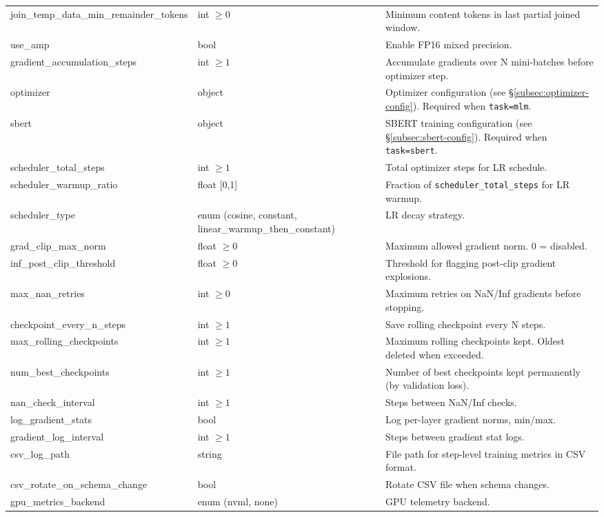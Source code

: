 \begin{longtable}{>{\ttfamily}l>{\raggedright\arraybackslash}p{3.5cm}>{\raggedright\arraybackslash}p{8.5cm}}
join\_temp\_data\_min\_remainder\_tokens & int $\ge 0$ & Minimum content tokens in last partial joined window. \\
use\_amp & bool & Enable FP16 mixed precision. \\
gradient\_accumulation\_steps & int $\ge 1$ & Accumulate gradients over N mini-batches before optimizer step. \\
optimizer & object & Optimizer configuration (see \S\ref{subsec:optimizer-config}). Required when \texttt{task=mlm}. \\
sbert & object & SBERT training configuration (see \S\ref{subsec:sbert-config}). Required when \texttt{task=sbert}. \\
scheduler\_total\_steps & int $\ge 1$ & Total optimizer steps for LR schedule. \\
scheduler\_warmup\_ratio & float [0,1] & Fraction of \texttt{scheduler\_total\_steps} for LR warmup. \\
scheduler\_type & enum (cosine, constant, linear\_warmup\_then\_constant) & LR decay strategy. \\
grad\_clip\_max\_norm & float $\ge 0$ & Maximum allowed gradient norm. 0 = disabled. \\
inf\_post\_clip\_threshold & float $\ge 0$ & Threshold for flagging post-clip gradient explosions. \\
max\_nan\_retries & int $\ge 0$ & Maximum retries on NaN/Inf gradients before stopping. \\
checkpoint\_every\_n\_steps & int $\ge 1$ & Save rolling checkpoint every N steps. \\
max\_rolling\_checkpoints & int $\ge 1$ & Maximum rolling checkpoints kept. Oldest deleted when exceeded. \\
num\_best\_checkpoints & int $\ge 1$ & Number of best checkpoints kept permanently (by validation loss). \\
nan\_check\_interval & int $\ge 1$ & Steps between NaN/Inf checks. \\
log\_gradient\_stats & bool & Log per-layer gradient norms, min/max. \\
gradient\_log\_interval & int $\ge 1$ & Steps between gradient stat logs. \\
csv\_log\_path & string & File path for step-level training metrics in CSV format. \\
csv\_rotate\_on\_schema\_change & bool & Rotate CSV file when schema changes. \\
gpu\_metrics\_backend & enum (nvml, none) & GPU telemetry backend. \\

\end{longtable}

